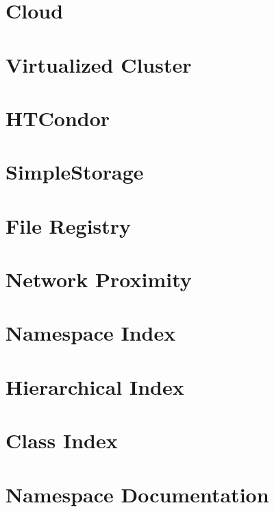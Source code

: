 \documentclass[twoside]{book}
\newcommand{\+}{\discretionary{\mbox{\scriptsize$\hookleftarrow$}}{}{}}
\begin{document}
\chapter{Cloud}
\label{guide-cloud}

\chapter{Virtualized Cluster}
\label{guide-virtualizedcluster}

\chapter{H\+T\+Condor}
\label{guide-htcondor}

\chapter{Simple\+Storage}
\label{guide-simplestorage}

\chapter{File Registry}
\label{guide-fileregistry}

\chapter{Network Proximity}
\label{guide-networkproximity}

\chapter{Namespace Index}

\chapter{Hierarchical Index}

\chapter{Class Index}

\chapter{Namespace Documentation}

\end{document}
